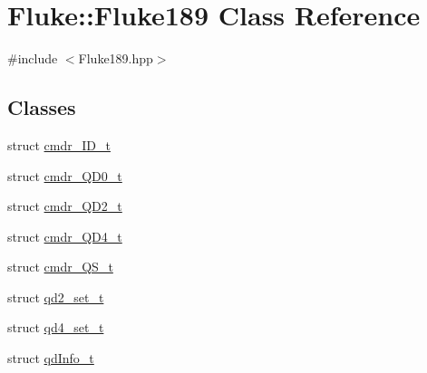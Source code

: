 \hypertarget{classFluke_1_1Fluke189}{
\section{Fluke::Fluke189 Class Reference}
\label{classFluke_1_1Fluke189}
}


{\ttfamily \#include $<$Fluke189.hpp$>$}\subsection*{Classes}
\begin{DoxyCompactItemize}
\item 
struct \hyperlink{structFluke_1_1Fluke189_1_1cmdr__ID__t}{cmdr\_\-ID\_\-t}
\item 
struct \hyperlink{structFluke_1_1Fluke189_1_1cmdr__QD0__t}{cmdr\_\-QD0\_\-t}
\item 
struct \hyperlink{structFluke_1_1Fluke189_1_1cmdr__QD2__t}{cmdr\_\-QD2\_\-t}
\item 
struct \hyperlink{structFluke_1_1Fluke189_1_1cmdr__QD4__t}{cmdr\_\-QD4\_\-t}
\item 
struct \hyperlink{structFluke_1_1Fluke189_1_1cmdr__QS__t}{cmdr\_\-QS\_\-t}
\item 
struct \hyperlink{structFluke_1_1Fluke189_1_1qd2__set__t}{qd2\_\-set\_\-t}
\item 
struct \hyperlink{structFluke_1_1Fluke189_1_1qd4__set__t}{qd4\_\-set\_\-t}
\item 
struct \hyperlink{structFluke_1_1Fluke189_1_1qdInfo__t}{qdInfo\_\-t}
\end{DoxyCompactItemize}
